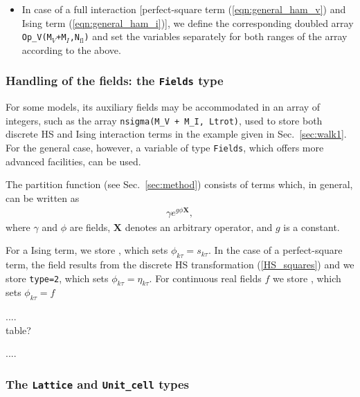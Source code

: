 \begin{itemize}
\item In case of a full interaction [perfect-square term (\ref{eqn:general_ham_v}) and Ising term (\ref{eqn:general_ham_i})],
we  define  the corresponding doubled array \texttt{Op\_V(M$_V$+M$_I$,N$_\mathrm{fl}$)} and set the variables separately for both ranges of the array according to the above.  

\end{itemize}

\subsubsection{ Handling of the fields: the \texttt{Fields}  type } \label{sec:fields}

For some models, its auxiliary fields may be accommodated in an array of integers, such as the array \texttt{nsigma(M\_V + M\_I, Ltrot)}, used to store both discrete HS and Ising interaction terms in the example given in Sec.~\ref{sec:walk1}. For the general case, however, a variable of type \texttt{Fields}, which offers more advanced facilities, can be used.

The partition function (see Sec.~\ref{sec:method}) consists of terms which, in general, can be written as
\begin{align}
\gamma e^{g \phi \bm{X} },
\end{align}
where $\gamma$ and $\phi$ are fields, $\bm{X}$ denotes an arbitrary operator, and $g$ is a constant.


For a Ising term, we store , which sets $\phi_{k\tau}=s_{k\tau}$. 
In the case of a perfect-square term, the field results from the discrete HS transformation (\ref{HS_squares}) and we store \texttt{type=2}, which sets $\phi_{k\tau}=\eta_{k\tau}$. For continuous real fields $f$ we store , which sets $\phi_{k\tau}=f$

....\\

table?

....\\

\subsubsection{The \texttt{Lattice} and \texttt{Unit\_cell} types}\label{sec:latt}

